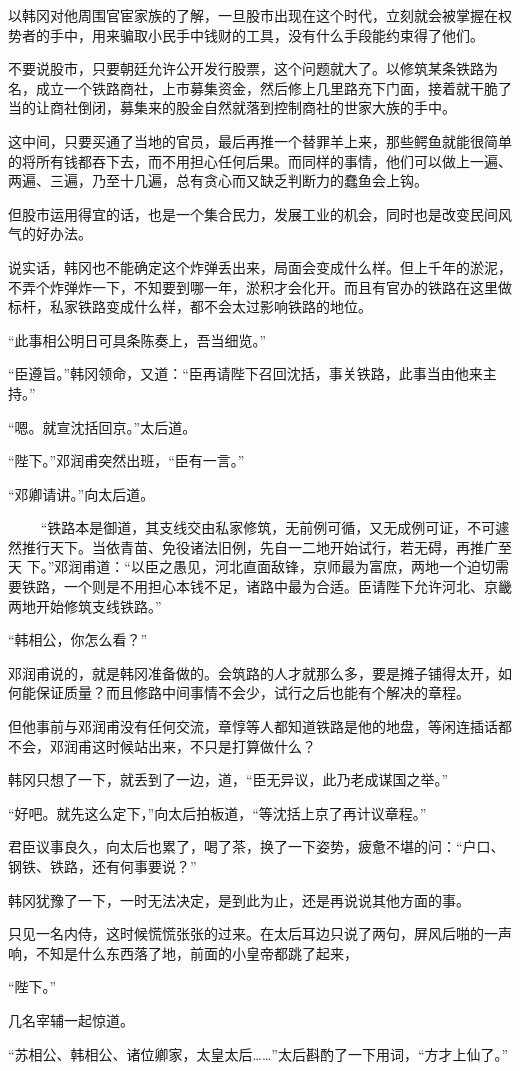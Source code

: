 以韩冈对他周围官宦家族的了解，一旦股市出现在这个时代，立刻就会被掌握在权势者的手中，用来骗取小民手中钱财的工具，没有什么手段能约束得了他们。

不要说股市，只要朝廷允许公开发行股票，这个问题就大了。以修筑某条铁路为名，成立一个铁路商社，上市募集资金，然后修上几里路充下门面，接着就干脆了当的让商社倒闭，募集来的股金自然就落到控制商社的世家大族的手中。

这中间，只要买通了当地的官员，最后再推一个替罪羊上来，那些鳄鱼就能很简单的将所有钱都吞下去，而不用担心任何后果。而同样的事情，他们可以做上一遍、两遍、三遍，乃至十几遍，总有贪心而又缺乏判断力的蠢鱼会上钩。

但股市运用得宜的话，也是一个集合民力，发展工业的机会，同时也是改变民间风气的好办法。

说实话，韩冈也不能确定这个炸弹丢出来，局面会变成什么样。但上千年的淤泥，不弄个炸弹炸一下，不知要到哪一年，淤积才会化开。而且有官办的铁路在这里做标杆，私家铁路变成什么样，都不会太过影响铁路的地位。

“此事相公明日可具条陈奏上，吾当细览。”

“臣遵旨。”韩冈领命，又道：“臣再请陛下召回沈括，事关铁路，此事当由他来主持。”

“嗯。就宣沈括回京。”太后道。

“陛下。”邓润甫突然出班，“臣有一言。”

“邓卿请讲。”向太后道。

　
　“铁路本是御道，其支线交由私家修筑，无前例可循，又无成例可证，不可遽然推行天下。当依青苗、免役诸法旧例，先自一二地开始试行，若无碍，再推广至天
下。”邓润甫道：“以臣之愚见，河北直面敌锋，京师最为富庶，两地一个迫切需要铁路，一个则是不用担心本钱不足，诸路中最为合适。臣请陛下允许河北、京畿
两地开始修筑支线铁路。”

“韩相公，你怎么看？”

邓润甫说的，就是韩冈准备做的。会筑路的人才就那么多，要是摊子铺得太开，如何能保证质量？而且修路中间事情不会少，试行之后也能有个解决的章程。

但他事前与邓润甫没有任何交流，章惇等人都知道铁路是他的地盘，等闲连插话都不会，邓润甫这时候站出来，不只是打算做什么？

韩冈只想了一下，就丢到了一边，道，“臣无异议，此乃老成谋国之举。”

“好吧。就先这么定下，”向太后拍板道，“等沈括上京了再计议章程。”

君臣议事良久，向太后也累了，喝了茶，换了一下姿势，疲惫不堪的问：“户口、钢铁、铁路，还有何事要说？”

韩冈犹豫了一下，一时无法决定，是到此为止，还是再说说其他方面的事。

只见一名内侍，这时候慌慌张张的过来。在太后耳边只说了两句，屏风后啪的一声响，不知是什么东西落了地，前面的小皇帝都跳了起来，

“陛下。”

几名宰辅一起惊道。

“苏相公、韩相公、诸位卿家，太皇太后……”太后斟酌了一下用词，“方才上仙了。”
